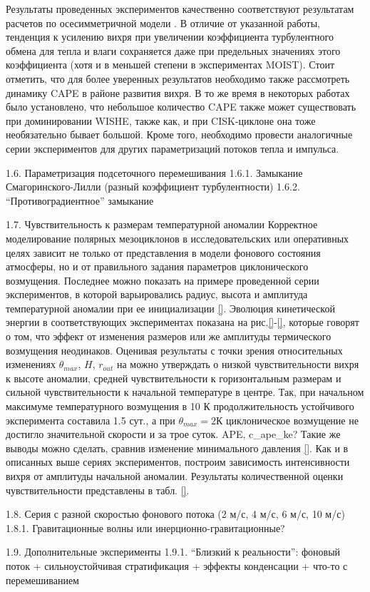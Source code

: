 Результаты проведенных экспериментов качественно соответствуют результатам расчетов по осесимметричной модели \cite{CraigGray1996, EmanuelRotunno}. В отличие от указанной работы, тенденция к усилению вихря при увеличении коэффициента турбулентного обмена для тепла и влаги сохраняется даже при предельных значениях этого коэффициента (хотя и в меньшей степени в экспериментах MOIST). Стоит отметить, что для более уверенных результатов необходимо также рассмотреть динамику CAPE в районе развития вихря. В то же время в некоторых работах было установлено, что небольшое количество CAPE также может существовать при доминировании WISHE, также как, и при CISK-циклоне она тоже необязательно бывает большой. Кроме того, необходимо провести аналогичные серии экспериментов для других параметризаций потоков тепла и импульса.


1.6.	Параметризация подсеточного перемешивания
1.6.1.	Замыкание Смагоринского-Лилли (разный коэффициент турбулентности) 
1.6.2.	“Противоградиентное” замыкание

1.7.	Чувствительность к размерам температурной аномалии
Корректное моделирование полярных мезоциклонов в исследовательских или оперативных целях зависит не только от представления в модели фонового состояния атмосферы, но и от правильного задания параметров циклонического возмущения. Последнее можно показать на примере проведенной серии экспериментов, в которой варьировались радиус, высота и амплитуда температурной аномалии при ее инициализации \ref{}. Эволюция кинетической энергии в соответствующих экспериментах показана на рис.\ref{}-\ref{}, которые говорят о том, что эффект от изменения размеров или же амплитуды термического возмущения неодинаков. Оценивая результаты с точки зрения относительных изменениях $\theta_{max}$, $H$, $r_{out}$ на можно утверждать о низкой чувствительности вихря к высоте аномалии, средней чувствительности к горизонтальным размерам и сильной чувствительности к начальной температуре в центре. Так, при начальном максимуме температурного возмущения в 10 К продолжительность устойчивого эксперимента составила 1.5 сут., а при $\theta_{max}=2 К$ циклоническое возмущение не достигло значительной скорости и за трое суток.
APE, c_ape_ke?
Такие же выводы можно сделать, сравнив изменение минимального давления \ref{}. Как и в описанных выше сериях экспериментов, построим зависимость интенсивности вихря от амплитуды начальной аномалии. Результаты количественной оценки чувствительности представлены в табл. \ref{}. 

1.8.	Серия с разной скоростью фонового потока (2 м/с, 4 м/с, 6 м/с, 10 м/с)
1.8.1.	Гравитационные волны или инерционно-гравитационные?


1.9.	Дополнительные эксперименты
1.9.1.	“Близкий к реальности”: фоновый поток + сильноустойчивая стратификация + эффекты конденсации + что-то с перемешиванием

